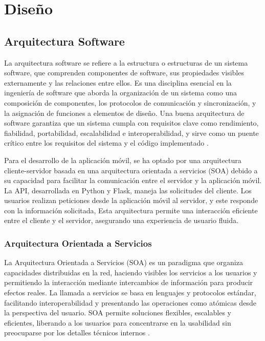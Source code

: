 \chapter{Diseño}

\section{Arquitectura Software}

La arquitectura software se refiere a la estructura o estructuras de un sistema software, que comprenden componentes de software, sus propiedades visibles externamente y las relaciones entre ellos. Es una disciplina esencial en la ingeniería de software que aborda la organización de un sistema como una composición de componentes, los protocolos de comunicación y sincronización, y la asignación de funciones a elementos de diseño. Una buena arquitectura de software garantiza que un sistema cumpla con requisitos clave como rendimiento, fiabilidad, portabilidad, escalabilidad e interoperabilidad, y sirve como un puente crítico entre los requisitos del sistema y el código implementado \cite{garlan} \cite{hofmeister} \cite{richards}.

Para el desarrollo de la aplicación móvil, se ha optado por una arquitectura cliente-servidor basada en una arquitectura orientada a servicios (SOA) debido a su capacidad para facilitar la comunicación entre el servidor y la aplicación móvil. La API, desarrollada en Python y Flask, maneja las solicitudes del cliente. Los usuarios realizan peticiones desde la aplicación móvil al servidor, y este responde con la información solicitada, Esta arquitectura permite una interacción eficiente entre el cliente y el servidor, asegurando una experiencia de usuario fluida.


\subsection{Arquitectura Orientada a Servicios}

La Arquitectura Orientada a Servicios (SOA) es un paradigma que organiza capacidades distribuidas en la red, haciendo visibles los servicios a los usuarios y permitiendo la interacción mediante intercambios de información para producir efectos reales. La llamada a servicios se basa en lenguajes y protocolos estándar, facilitando interoperabilidad y presentando las operaciones como atómicas desde la perspectiva del usuario. SOA permite soluciones flexibles, escalables y eficientes, liberando a los usuarios para concentrarse en la usabilidad sin preocuparse por los detalles técnicos internos \cite{laskey} \cite{erl}.

